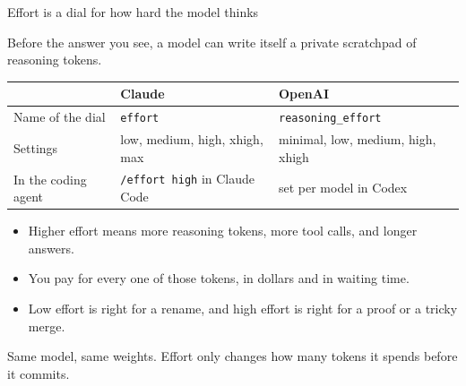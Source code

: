 \documentclass[aspectratio=169,11pt]{beamer}
\begin{document}
\begin{frame}[fragile]{Effort is a dial for how hard the model thinks}

Before the answer you see, a model can write itself a private scratchpad of reasoning tokens.

\vspace{0.1cm}

\begin{center}
\footnotesize
\begin{tabular}{@{}lll@{}}
\toprule
 & \textbf{Claude} & \textbf{OpenAI} \\
\midrule
Name of the dial & \texttt{effort} & \texttt{reasoning\_effort} \\
Settings & low, medium, high, xhigh, max & minimal, low, medium, high, xhigh \\
In the coding agent & \texttt{/effort high} in Claude Code & set per model in Codex \\
\bottomrule
\end{tabular}
\end{center}

\vspace{0.1cm}

\begin{itemize}\setlength\itemsep{0.1em}
    \item Higher effort means more reasoning tokens, more tool calls, and longer answers.
    \item You pay for every one of those tokens, in dollars and in waiting time.
    \item Low effort is right for a rename, and high effort is right for a proof or a tricky merge.
\end{itemize}

\vspace{0.15cm}

\alert{Same model, same weights. Effort only changes how many tokens it spends before it commits.}


\end{frame}
\end{document}
